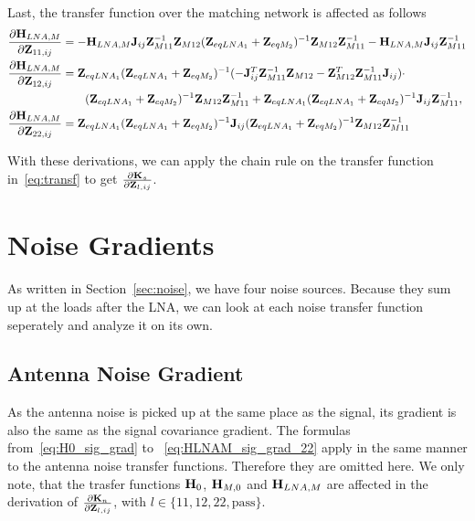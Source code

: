 Last, the transfer function over the matching network is affected as follows
\begin{align}
\label{eq:HLNAM_sig_grad}
\frac{\partial\mathbf{H}_{LNA,M}}{\partial\mathbf{Z}_{11,ij}}&=
-\mathbf{H}_{LNA,M}\mathbf{J}_{ij}\mathbf{Z}_{M11}^{-1}\mathbf{Z}_{M12}(\mathbf{Z}_{eqLNA_1} + \mathbf{Z}_{eqM_2})^{-1}\mathbf{Z}_{M12}\mathbf{Z}_{M11}^{-1}-\mathbf{H}_{LNA,M}\mathbf{J}_{ij}\mathbf{Z}_{M11}^{-1}\\\nonumber
\frac{\partial\mathbf{H}_{LNA,M}}{\partial\mathbf{Z}_{12,ij}}&=
\mathbf{Z}_{eqLNA_1}(\mathbf{Z}_{eqLNA_1} + \mathbf{Z}_{eqM_2})^{-1}(-\mathbf{J}_{ij}^T\mathbf{Z}_{M11}^{-1}\mathbf{Z}_{M12} - \mathbf{Z}_{M12}^T\mathbf{Z}_{M11}^{-1}\mathbf{J}_{ij})\cdot\\
&\qquad(\mathbf{Z}_{eqLNA_1} + \mathbf{Z}_{eqM_2})^{-1}\mathbf{Z}_{M12}\mathbf{Z}_{M11}^{-1} + \mathbf{Z}_{eqLNA_1}(\mathbf{Z}_{eqLNA_1} + \mathbf{Z}_{eqM_2})^{-1}\mathbf{J}_{ij}\mathbf{Z}_{M11}^{-1},\\
\frac{\partial\mathbf{H}_{LNA,M}}{\partial\mathbf{Z}_{22,ij}}&=
\mathbf{Z}_{eqLNA_1}(\mathbf{Z}_{eqLNA_1} + \mathbf{Z}_{eqM_2})^{-1}\mathbf{J}_{ij}(\mathbf{Z}_{eqLNA_1} + \mathbf{Z}_{eqM_2})^{-1}\mathbf{Z}_{M12}\mathbf{Z}_{M11}^{-1}
\label{eq:HLNAM_sig_grad_22}
\end{align}

With these derivations, we can apply the chain rule on the transfer function in~\eqref{eq:transf} to get $\frac{\partial\mathbf{K}_s}{\partial\mathbf{Z}_{l,ij}}$.

\section{Noise Gradients}
\label{sec:noise_gradient}

As written in Section~\ref{sec:noise}, we have four noise sources.
Because they sum up at the loads after the LNA, we can look at each noise transfer function seperately and analyze it on its own.

\subsection{Antenna Noise Gradient}
\label{sec:ant_noise_grad}
As the antenna noise is picked up at the same place as the signal, its gradient is also the same as the signal covariance gradient.
The formulas from~\eqref{eq:H0_sig_grad} to ~\eqref{eq:HLNAM_sig_grad_22} apply in the same manner to the antenna noise transfer functions.
Therefore they are omitted here.
We only note, that the trasfer functions $\mathbf{H}_{0}$, $\mathbf{H}_{M,0}$ and $\mathbf{H}_{LNA,M}$ are affected in the derivation of $\frac{\partial\mathbf{K}_n}{\partial\mathbf{Z}_{l,ij}}$, with $l\in\{11,12,22,\text{pass}\}$.

